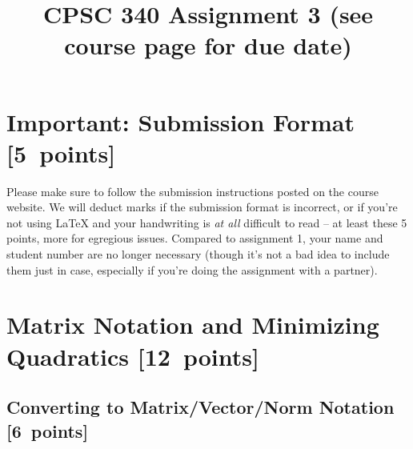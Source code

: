 \documentclass{article}
\newcommand{\blu}[1]{{\textcolor{blu}{#1}}}
\let\ask\blu
\newcommand\pts[1]{\textcolor{pointscolour}{[#1~points]}}
\begin{document}
\title{CPSC 340 Assignment 3 (see course page for due date)}
\date{}
\maketitle


\vspace{-4em}



\section*{Important: Submission Format \pts{5}}

    Please make sure to follow the submission instructions posted on the course website.
    \ask{We will deduct marks if the submission format is incorrect, or if you're not using \LaTeX{} and your handwriting is \emph{at all} difficult to read} -- at least these 5 points, more for egregious issues.
    Compared to assignment 1, your name and student number are no longer necessary (though it's not a bad idea to include them just in case, especially if you're doing the assignment with a partner).


\section{Matrix Notation and Minimizing Quadratics \pts{12}}


\subsection{Converting to Matrix/Vector/Norm Notation \pts{6}}
\end{document}
